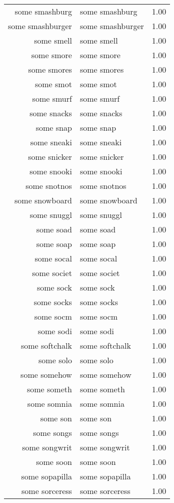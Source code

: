 \begin{table}[ht]
\begin{tabular}{rlr}
  some smashburg & some smashburg & 1.00 \\ 
  some smashburger & some smashburger & 1.00 \\ 
  some smell & some smell & 1.00 \\ 
  some smore & some smore & 1.00 \\ 
  some smores & some smores & 1.00 \\ 
  some smot & some smot & 1.00 \\ 
  some smurf & some smurf & 1.00 \\ 
  some snacks & some snacks & 1.00 \\ 
  some snap & some snap & 1.00 \\ 
  some sneaki & some sneaki & 1.00 \\ 
  some snicker & some snicker & 1.00 \\ 
  some snooki & some snooki & 1.00 \\ 
  some snotnos & some snotnos & 1.00 \\ 
  some snowboard & some snowboard & 1.00 \\ 
  some snuggl & some snuggl & 1.00 \\ 
  some soad & some soad & 1.00 \\ 
  some soap & some soap & 1.00 \\ 
  some socal & some socal & 1.00 \\ 
  some societ & some societ & 1.00 \\ 
  some sock & some sock & 1.00 \\ 
  some socks & some socks & 1.00 \\ 
  some socm & some socm & 1.00 \\ 
  some sodi & some sodi & 1.00 \\ 
  some softchalk & some softchalk & 1.00 \\ 
  some solo & some solo & 1.00 \\ 
  some somehow & some somehow & 1.00 \\ 
  some someth & some someth & 1.00 \\ 
  some somnia & some somnia & 1.00 \\ 
  some son & some son & 1.00 \\ 
  some songs & some songs & 1.00 \\ 
  some songwrit & some songwrit & 1.00 \\ 
  some soon & some soon & 1.00 \\ 
  some sopapilla & some sopapilla & 1.00 \\ 
  some sorceress & some sorceress & 1.00 \\ 

\end{tabular}
\end{table}
